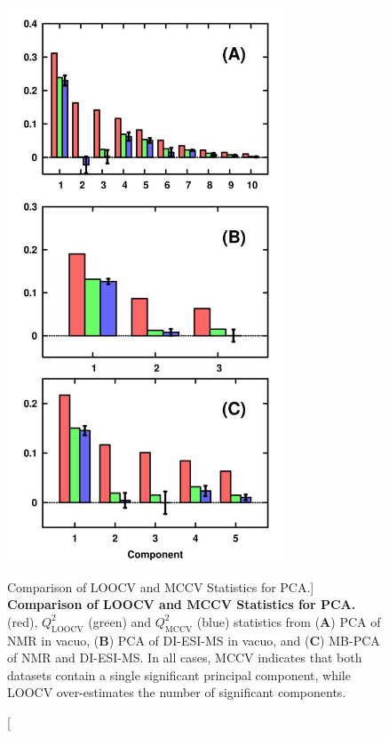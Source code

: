 \begin{figure}
\includegraphics[width=3.25in]{figs/apps/09-rqpca.png}
\caption
      [Comparison of LOOCV and MCCV \qsq{} Statistics for PCA.]{
  {\bf Comparison of LOOCV and MCCV \qsq{} Statistics for PCA.}
  \\
  \rsq{} (red), $Q^2_{\mathrm{LOOCV}}$ (green) and $Q^2_{\mathrm{MCCV}}$ (blue)
  statistics from ({\bf A}) PCA of \hnmr{} NMR in vacuo, ({\bf B}) PCA of
  DI-ESI-MS in vacuo, and ({\bf C}) MB-PCA of \hnmr{} NMR and DI-ESI-MS.
  In all cases, MCCV indicates that both datasets contain a single significant
  principal component, while LOOCV over-estimates the number of significant
  components.
}
\label{figure.4.9}
\end{figure}

